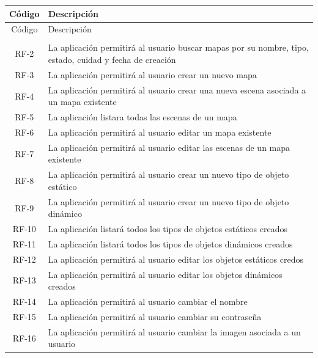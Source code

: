 \begin{longtable}[H]{|c|p{10cm}|}
\hline
Código & Descripción \\
\hline \hline
\endfirsthead

\hline
Código & Descripción \\
\hline \hline
\endhead

\multicolumn{2}{c}{}
\endfoot

\endlastfoot

RF-1  & La aplicación permitirá crear un nuevo usuario\\ \hline
RF-2  & La aplicación permitirá al usuario buscar mapas por su nombre, tipo, estado, cuidad y fecha de creación\\ \hline
RF-3  & La aplicación permitirá al usuario crear un nuevo mapa\\ \hline
RF-4  & La aplicación permitirá al usuario crear una nueva escena asociada a un mapa existente\\ \hline
RF-5  & La aplicación listara todas las escenas de un mapa\\ \hline
RF-6  & La aplicación permitirá al usuario editar un mapa existente\\ \hline
RF-7  & La aplicación permitirá al usuario editar las escenas de un mapa existente\\ \hline
RF-8  & La aplicación permitirá al usuario crear un nuevo tipo de objeto estático\\ \hline
RF-9  & La aplicación permitirá al usuario crear un nuevo tipo de objeto dinámico\\ \hline
RF-10 & La aplicación listará todos los tipos de objetos estáticos creados\\ \hline
RF-11 & La aplicación listará todos los tipos de objetos dinámicos creados\\ \hline
RF-12 & La aplicación permitirá al usuario editar los objetos estáticos credos\\ \hline
RF-13 & La aplicación permitirá al usuario editar los objetos dinámicos creados\\ \hline
RF-14 & La aplicación permitirá al usuario cambiar el nombre\\ \hline
RF-15 & La aplicación permitirá al usuario cambiar su contraseña\\ \hline
RF-16 & La aplicación permitirá al usuario cambiar la imagen asociada a un usuario\\ \hline

\end{longtable}
